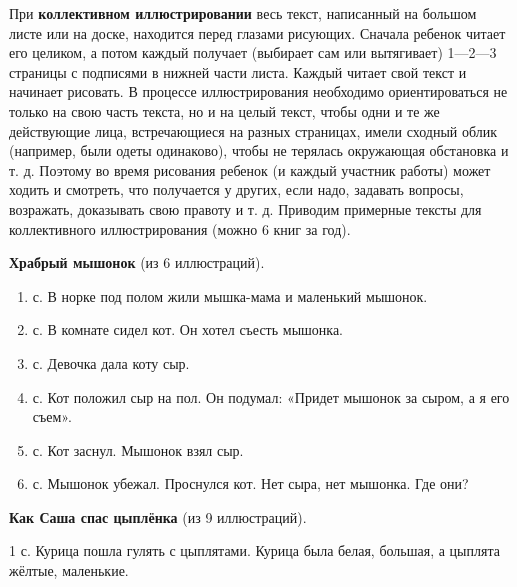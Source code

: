 \documentclass{book}
\begin{document}
При \textbf{коллективном иллюстрировании} весь текст, написанный на
большом листе или на доске, находится перед глазами рисующих. Сначала
ребенок читает его целиком, а потом каждый получает (выбирает сам или
вытягивает) 1---2---3 страницы с подписями в нижней части листа. Каждый
читает свой текст и начинает рисовать. В процессе иллюстрирования
необходимо ориентироваться не только на свою часть текста, но и на целый
текст, чтобы одни и те же действующие лица, встречающиеся на разных
страницах, имели сходный облик (например, были одеты одинаково), чтобы
не терялась окружающая обстановка и т. д. Поэтому во время рисования
ребенок (и каждый участник работы) может ходить и смотреть, что
получается у других, если надо, задавать вопросы, возражать, доказывать
свою правоту и т. д. Приводим примерные тексты для коллективного
иллюстрирования (можно 6 книг за год).

\textbf{Храбрый мышонок} (из 6 иллюстраций).


\begin{enumerate}
\def\labelenumi{\arabic{enumi}.}
\item
  
  с. В норке под полом жили мышка-мама и маленький мышонок.
  
\item
  
  с. В комнате сидел кот. Он хотел съесть мышонка.
  
\item
  
  с. Девочка дала коту сыр.
  
\item
  
  с. Кот положил сыр на пол. Он подумал: «Придет мышонок за сыром, а я
  его съем».
  
\item
  
  с. Кот заснул. Мышонок взял сыр.
  
\item
  
  с. Мышонок убежал. Проснулся кот. Нет сыра, нет мышонка. Где они?
  
\end{enumerate}


\textbf{Как Саша спас цыплёнка} (из 9 иллюстраций).

1 с. Курица пошла гулять с цыплятами. Курица была белая, большая, а
цыплята жёлтые, маленькие.
\end{document}
